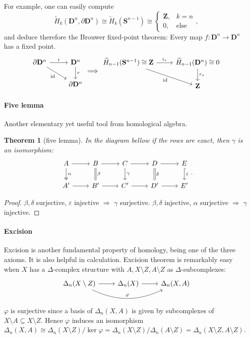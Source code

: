 \documentclass[11pt]{article}
\theoremstyle{definition}
\theoremstyle{plain}
\newtheorem{theorem}{Theorem}[section]
\newcommand{\id}{\textup{id}}
\newcommand{\Z}{\mathbf{Z}}
\newcommand{\1}{\mathbf{1}}
\newcommand{\s}{\mathbf{S}}
\begin{document}
For example, one can easily compute
\[\widetilde{H}_k(\mathbf{D}^n,\partial\mathbf{D}^n)\cong \widetilde{H}_k(\s^{n-1})\cong\begin{cases}\Z,&k=n\\0,&\textrm{else}
\end{cases},\]
and deduce therefore the Brouwer fixed-point theorem: Every map $f:\mathbf{D}^n\to\mathbf{D}^n$ has a fixed point.
\[\begin{tikzcd}
\partial\mathbf{D}^n\arrow[swap]{dr}{\id}\arrow{r}{i}&\mathbf{D}^n\arrow{d}{r}\\
&\partial\mathbf{D}^n
\end{tikzcd}\Longrightarrow\begin{tikzcd}
\widetilde{H}_{n-1}(\mathbf{S}^{n-1})\cong\Z\arrow[swap]{dr}{\id}\arrow{r}{i_\ast}&\widetilde{H}_{n-1}(\mathbf{D}^n)\cong0\arrow{d}{r_\ast}\\
&\Z
\end{tikzcd}\]

\paragraph{Five lemma} Another elementary yet useful tool from homological algebra.

\begin{theorem}[five lemma]
In the diagram bellow if the rows are exact, then $\gamma$ is an isomorphism:
\[\begin{tikzcd}
A\arrow[r]\arrow[two heads]{d}{\alpha}&B\arrow[equal]{d}{\beta}\arrow[r]&C\arrow{d}{\gamma}\arrow[r]&D\arrow[equal]{d}{\delta}\arrow[r]&E\arrow[hook]{d}{\varepsilon}\\
A'\arrow[r]&B'\arrow[r]&C'\arrow[r]&D'\arrow[r]&E'
\end{tikzcd}.\]
\end{theorem}
\begin{proof}
$\beta,\delta$ surjective, $\varepsilon$ injective $\Rightarrow$ $\gamma$ surjective. $\beta,\delta$ injective, $\alpha$ surjective $\Rightarrow$ $\gamma$ injective.
\end{proof}

\paragraph{Excision} Excision is another fundamental property of homology, being one of the three axioms. It is also helpful in calculation. Excision theorem is remarkably easy when $X$ has a $\Delta$-complex structure with $A,X\setminus Z,A\setminus Z$ as $\Delta$-subcomplexes:
\[\begin{tikzcd}
\Delta_n(X\setminus Z)\arrow[bend right=25]{rr}{\varphi}\arrow{r}&\Delta_n(X)\arrow[r]&\Delta_n(X,A)
\end{tikzcd}\]
$\varphi$ is surjective since a basis of $\Delta_n(X,A)$ is given by subcomplexes of $X\setminus A\subseteq X\setminus Z$. Hence $\varphi$ induces an isomorphism $\Delta_n(X,A)\cong\Delta_n(X\setminus Z)/\ker\varphi=\Delta_n(X\setminus Z)/\Delta_n(A\setminus Z)=\Delta_n(X\setminus Z,A\setminus Z)$.
\end{document}
